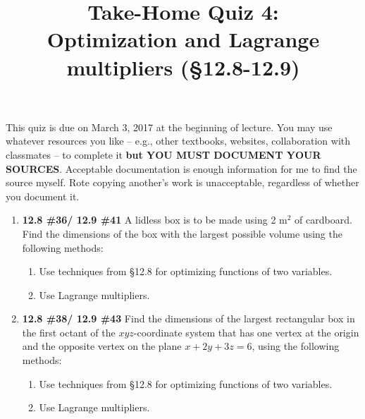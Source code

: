 \documentclass[%
]{article}
\title{\vspace{-3.5pc} 
	\flushleft \bf \Large Take-Home Quiz 4: \\ Optimization and Lagrange multipliers (\S 12.8-12.9)}
\date{}
\begin{document}
\maketitle

\vspace{-3pc}
 This quiz is due on March 3, 2017 at the beginning of lecture.  You may use whatever resources you like -- e.g., other textbooks, websites, collaboration with classmates -- to complete it \textbf{but YOU MUST DOCUMENT YOUR SOURCES}.  Acceptable documentation is enough information for me to find the source myself.  Rote copying another's work is unacceptable, regardless of whether you document it.  

\noindent\hrulefill

\begin{enumerate}
\item {\bf 12.8 \#36/ 12.9 \#41}
A lidless box is to be made using 2 m$^2$ of cardboard.  Find the dimensions of the box with the largest possible volume using the following methods:
\begin{enumerate}
\item Use techniques from \S12.8 for optimizing functions of two variables.
\item Use Lagrange multipliers.
\end{enumerate}

\item {\bf 12.8 \#38/ 12.9 \#43}
Find the dimensions of the largest rectangular box in the first octant of the $xyz$-coordinate system that has one vertex at the origin and the opposite vertex on the plane $x+2y+3z=6$, using the following methods:
\begin{enumerate}
\item Use techniques from \S12.8 for optimizing functions of two variables.
\item Use Lagrange multipliers.
\end{enumerate}

\end{enumerate}
\end{document}
